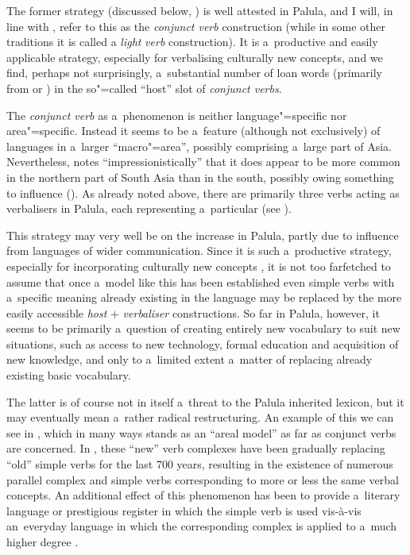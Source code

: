 The former strategy (discussed below, ) is well attested in Palula, and I will, in line with \citet[326]{masica1991}, refer to this as the \textit{conjunct verb} construction (while in some other traditions it is called a \textit{light} \textit{verb} construction). It is a~productive and easily applicable strategy, especially for verbalising culturally new concepts, and we find, perhaps not surprisingly, a~substantial number of loan words (primarily from  or ) in the so"=called ``host'' slot of \textit{conjunct verbs}. 



The \textit{conjunct verb} as a~phenomenon is neither language"=specific nor area"=specific. Instead it seems to be a~feature (although not exclusively) of languages in a~larger ``macro"=area'', possibly comprising a~large part of Asia. Nevertheless, \citeauthor{masica1991} notes ``impressionistically'' that it does appear to be more common in the northern part of South Asia than in the south, possibly owing something to  influence (\citeyear[368]{masica1991}). As already noted above, there are primarily three verbs acting as verbalisers in Palula, each representing a~particular  (see ). 



This strategy may very well be on the increase in Palula, partly due to influence from languages of wider communication. Since it is such a~productive strategy, especially for incorporating culturally new concepts \citep[85]{gambhir1993}, it is not too farfetched to assume that once a~model like this has been established even simple verbs with a~specific meaning already existing in the language may be replaced by the more easily accessible \textit{host} + \textit{verbaliser} constructions. So far in Palula, however, it seems to be primarily a~question of creating entirely new vocabulary to suit new situations, such as access to new technology, formal education and acquisition of new knowledge, and only to a~limited extent a~matter of replacing already existing basic vocabulary. 



The latter is of course not in itself a~threat to the Palula inherited lexicon, but it may eventually mean a~rather radical restructuring. An example of this we can see in , which in many ways stands as an ``areal model'' as far as conjunct verbs are concerned. In , these ``new'' verb complexes have been gradually replacing ``old'' simple verbs for the last 700 years, resulting in the existence of numerous parallel complex and simple verbs corresponding to more or less the same verbal concepts. An additional effect of this phenomenon has been to provide a~literary language or prestigious register in which the simple verb is used vis-à-vis an~everyday language in which the corresponding complex  is applied to a~much higher degree \citep[1369]{follietal2005}. 



